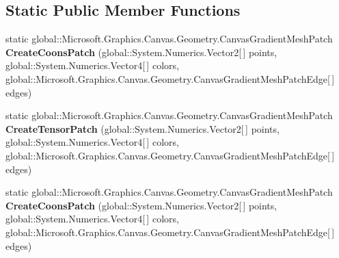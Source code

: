 \subsection*{Static Public Member Functions}
\begin{DoxyCompactItemize}
\item 
\mbox{\label{class_microsoft_1_1_graphics_1_1_canvas_1_1_geometry_1_1_canvas_gradient_mesh_a1250e69d906353253b5c257cb7b7fb9f}} 
static global\+::\+Microsoft.\+Graphics.\+Canvas.\+Geometry.\+Canvas\+Gradient\+Mesh\+Patch {\bfseries Create\+Coons\+Patch} (global\+::\+System.\+Numerics.\+Vector2\mbox{[}$\,$\mbox{]} points, global\+::\+System.\+Numerics.\+Vector4\mbox{[}$\,$\mbox{]} colors, global\+::\+Microsoft.\+Graphics.\+Canvas.\+Geometry.\+Canvas\+Gradient\+Mesh\+Patch\+Edge\mbox{[}$\,$\mbox{]} edges)
\item 
\mbox{\label{class_microsoft_1_1_graphics_1_1_canvas_1_1_geometry_1_1_canvas_gradient_mesh_a354ddcec29b2b78440f0ed1529ae8d0d}} 
static global\+::\+Microsoft.\+Graphics.\+Canvas.\+Geometry.\+Canvas\+Gradient\+Mesh\+Patch {\bfseries Create\+Tensor\+Patch} (global\+::\+System.\+Numerics.\+Vector2\mbox{[}$\,$\mbox{]} points, global\+::\+System.\+Numerics.\+Vector4\mbox{[}$\,$\mbox{]} colors, global\+::\+Microsoft.\+Graphics.\+Canvas.\+Geometry.\+Canvas\+Gradient\+Mesh\+Patch\+Edge\mbox{[}$\,$\mbox{]} edges)
\item 
\mbox{\label{class_microsoft_1_1_graphics_1_1_canvas_1_1_geometry_1_1_canvas_gradient_mesh_a1250e69d906353253b5c257cb7b7fb9f}} 
static global\+::\+Microsoft.\+Graphics.\+Canvas.\+Geometry.\+Canvas\+Gradient\+Mesh\+Patch {\bfseries Create\+Coons\+Patch} (global\+::\+System.\+Numerics.\+Vector2\mbox{[}$\,$\mbox{]} points, global\+::\+System.\+Numerics.\+Vector4\mbox{[}$\,$\mbox{]} colors, global\+::\+Microsoft.\+Graphics.\+Canvas.\+Geometry.\+Canvas\+Gradient\+Mesh\+Patch\+Edge\mbox{[}$\,$\mbox{]} edges)
\item 
\mbox{\label{class_microsoft_1_1_graphics_1_1_canvas_1_1_geometry_1_1_canvas_gradient_mesh_a354ddcec29b2b78440f0ed1529ae8d0d}} 

\end{DoxyCompactItemize}
